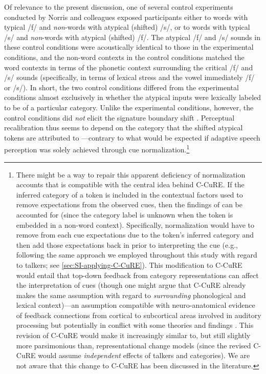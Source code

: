 \documentclass[
  11pt,
  man,floatsintext]{apa6}
\begin{document}
Of relevance to the present discussion, one of several control experiments conducted by Norris and colleagues exposed participants either to words with typical /f/ and \emph{non}-words with atypical (shifted) /s/, or to words with typical /s/ and \emph{non}-words with atypical (shifted) /f/. The atypical /f/ and /s/ sounds in these control conditions were acoustically identical to those in the experimental conditions, and the non-word contexts in the control conditions matched the word contexts in terms of the phonetic context surrounding the critical /f/ and /s/ sounds (specifically, in terms of lexical stress and the vowel immediately /f/ or /s/). In short, the two control conditions differed from the experimental conditions almost exclusively in whether the atypical inputs were lexically labeled to be of a particular category. Unlike the experimental conditions, however, the control conditions did \emph{not} elicit the signature boundary shift \autocite[Experiment 2]{norris2003}. Perceptual recalibration thus seems to depend on the category that the shifted atypical tokens are attributed to \autocite[227]{norris2003}---contrary to what would be expected if adaptive speech perception was solely achieved through cue normalization.\footnote{There might be a way to repair this apparent deficiency of normalization accounts that is compatible with the central idea behind C-CuRE. If the inferred category of a token is included in the contextual factors used to remove expectations from the observed cues, then the findings of \textcite{norris2003} can be accounted for (since the category label is unknown when the token is embedded in a non-word context). Specifically, normalization would have to remove from each cue expectations due to the token's inferred category and then add those expectations back in prior to interpreting the cue (e.g., following the same approach we employed throughout this study with regard to talkers; see \ref{sec:SI-applying-C-CuRE}). This modification to C-CuRE would entail that top-down feedback from category representations can affect the interpretation of cues (though one might argue that C-CuRE already makes the same assumption with regard to \emph{surrounding} phonological and lexical context)---an assumption compatible with neuro-anatomical evidence of feedback connections from cortical to subcortical areas involved in auditory processing but potentially in conflict with some theories and findings \autocites[e.g.,][]{norris2000a,norris-mcqueen2008}. This revision of C-CuRE would make it increasingly similar to, but still slightly more parsimonious than, representational change models (since the revised C-CuRE would assume \emph{independent} effects of talkers and categories). We are not aware that this change to C-CuRE has been discussed in the literature.}
\end{document}
